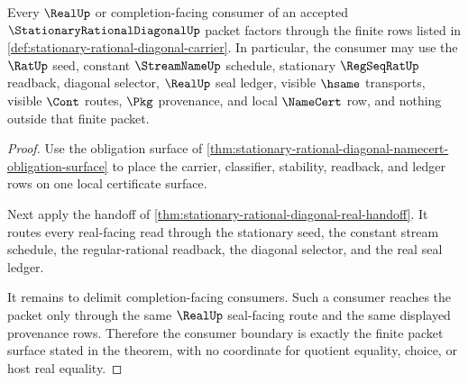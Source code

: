 \begin{theorem}
\label{thm:stationary-rational-diagonal-consumer-boundary}
Every $\RealUp$ or completion-facing consumer of an accepted
$\StationaryRationalDiagonalUp$ packet factors through the finite rows listed
in \autoref{def:stationary-rational-diagonal-carrier}. In particular, the
consumer may use the $\RatUp$ seed, constant $\StreamNameUp$ schedule,
stationary $\RegSeqRatUp$ readback, diagonal selector, $\RealUp$ seal ledger,
visible $\hsame$ transports, visible $\Cont$ routes, $\Pkg$ provenance, and
local $\NameCert$ row, and nothing outside that finite packet.
\end{theorem}
\begin{proof}
Use the obligation surface of
\autoref{thm:stationary-rational-diagonal-namecert-obligation-surface} to
place the carrier, classifier, stability, readback, and ledger rows on one
local certificate surface.

Next apply the handoff of
\autoref{thm:stationary-rational-diagonal-real-handoff}. It routes every
real-facing read through the stationary seed, the constant stream schedule, the
regular-rational readback, the diagonal selector, and the real seal ledger.

It remains to delimit completion-facing consumers. Such a consumer reaches the
packet only through the same $\RealUp$ seal-facing route and the same displayed
provenance rows. Therefore the consumer boundary is exactly the finite packet
surface stated in the theorem, with no coordinate for quotient equality,
choice, or host real equality.
\end{proof}

